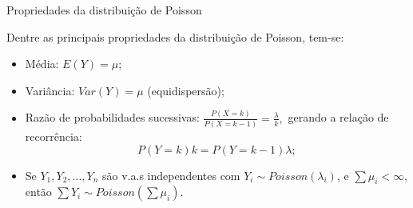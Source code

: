 \begin{frame}{Propriedades da distribuição de Poisson}

Dentre as principais propriedades da distribuição de Poisson, tem-se:
\vspace{0,3cm}
\begin{itemize}

    \item Média: $E(Y)= \mu$;
    \vspace{0,5cm}
    \item Variância: $Var(Y)=\mu$ (equidispersão);
    \vspace{0,5cm}
    \item Razão de probabilidades sucessivas: 
    $\frac{P\left ( X=k \right )}{P\left ( X=k-1 \right )}=\frac{\lambda}{k},$ 
    gerando a relação de recorrência:
    $$
        P(Y=k)k=P(Y=k-1)\lambda;
    $$
    \item Se $Y_{1},Y_{2},...,Y_{n}$ são v.a.s independentes com 
    $Y_{i}\sim Poisson(\lambda_{i})$, e $\sum\mu_{i}<\infty$, então 
    $\sum Y_{i}\sim Poisson(\sum\mu_{i})$.
    \end{itemize}
\end{frame}


